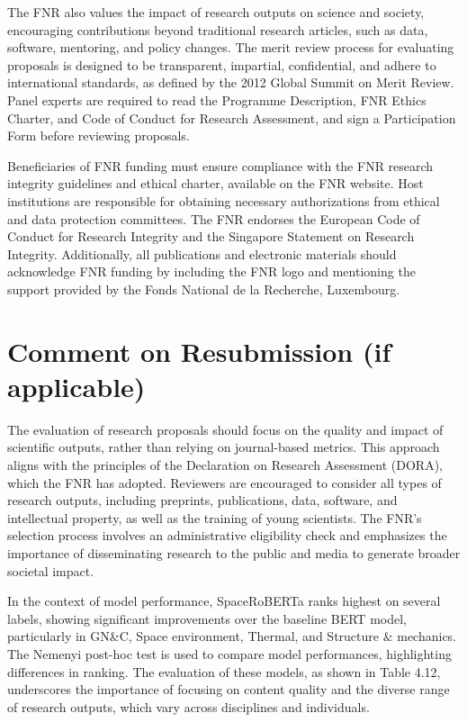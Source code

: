 \documentclass{article}
\begin{document}
The FNR also values the impact of research outputs on science and society, encouraging contributions beyond traditional research articles, such as data, software, mentoring, and policy changes. The merit review process for evaluating proposals is designed to be transparent, impartial, confidential, and adhere to international standards, as defined by the 2012 Global Summit on Merit Review. Panel experts are required to read the Programme Description, FNR Ethics Charter, and Code of Conduct for Research Assessment, and sign a Participation Form before reviewing proposals.

Beneficiaries of FNR funding must ensure compliance with the FNR research integrity guidelines and ethical charter, available on the FNR website. Host institutions are responsible for obtaining necessary authorizations from ethical and data protection committees. The FNR endorses the European Code of Conduct for Research Integrity and the Singapore Statement on Research Integrity. Additionally, all publications and electronic materials should acknowledge FNR funding by including the FNR logo and mentioning the support provided by the Fonds National de la Recherche, Luxembourg.

\section{Comment on Resubmission (if applicable)}

The evaluation of research proposals should focus on the quality and impact of scientific outputs, rather than relying on journal-based metrics. This approach aligns with the principles of the Declaration on Research Assessment (DORA), which the FNR has adopted. Reviewers are encouraged to consider all types of research outputs, including preprints, publications, data, software, and intellectual property, as well as the training of young scientists. The FNR's selection process involves an administrative eligibility check and emphasizes the importance of disseminating research to the public and media to generate broader societal impact.

In the context of model performance, SpaceRoBERTa ranks highest on several labels, showing significant improvements over the baseline BERT model, particularly in GN&C, Space environment, Thermal, and Structure & mechanics. The Nemenyi post-hoc test is used to compare model performances, highlighting differences in ranking. The evaluation of these models, as shown in Table 4.12, underscores the importance of focusing on content quality and the diverse range of research outputs, which vary across disciplines and individuals.
\end{document}

